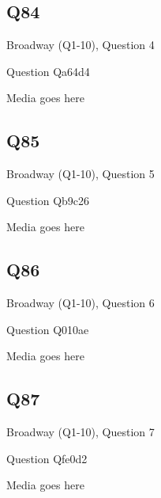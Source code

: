 \documentclass[11pt]{beamer}
\begin{document}
\subsection*{Q84}
\begin{frame}[t]{Broadway (Q1-10), Question 4}
\vspace{2em}
\begin{block}{Question}
Qa64d4
\end{block}
\begin{center}
Media goes here
\end{center}
\end{frame}
    

\subsection*{Q85}
\begin{frame}[t]{Broadway (Q1-10), Question 5}
\vspace{2em}
\begin{block}{Question}
Qb9c26
\end{block}
\begin{center}
Media goes here
\end{center}
\end{frame}
    

\subsection*{Q86}
\begin{frame}[t]{Broadway (Q1-10), Question 6}
\vspace{2em}
\begin{block}{Question}
Q010ae
\end{block}
\begin{center}
Media goes here
\end{center}
\end{frame}
    

\subsection*{Q87}
\begin{frame}[t]{Broadway (Q1-10), Question 7}
\vspace{2em}
\begin{block}{Question}
Qfe0d2
\end{block}
\begin{center}
Media goes here
\end{center}
\end{frame}
    
\end{document}
